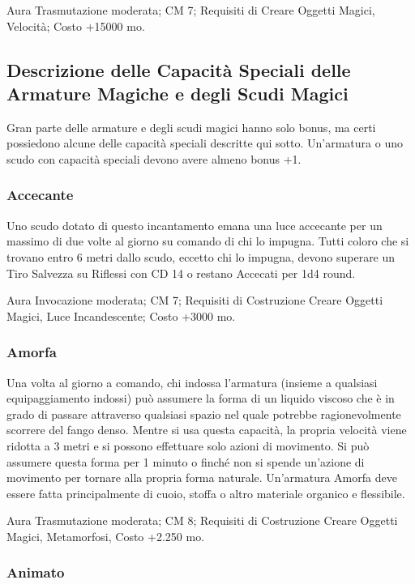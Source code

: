 \begin{multicols}{2}
Aura Trasmutazione moderata; CM 7; Requisiti di Creare Oggetti Magici, Velocità; Costo +15000 mo.

\subsection{Descrizione delle Capacità Speciali delle Armature Magiche e degli Scudi Magici}

Gran parte delle armature e degli scudi magici hanno solo bonus, ma certi possiedono alcune delle capacità speciali descritte qui sotto. Un'armatura o uno scudo con capacità speciali devono avere almeno bonus +1.

\subsubsection{Accecante}

Uno scudo dotato di questo incantamento emana una luce accecante per un massimo di due volte al giorno su comando di chi lo impugna. Tutti coloro che si trovano entro 6 metri dallo scudo, eccetto chi lo impugna, devono superare un Tiro Salvezza su Riflessi con CD 14 o restano Accecati per 1d4 round.

Aura Invocazione moderata; CM 7; Requisiti di Costruzione Creare Oggetti Magici, Luce Incandescente; Costo +3000 mo.

\subsubsection{Amorfa}

Una volta al giorno a comando, chi indossa l'armatura (insieme a qualsiasi equipaggiamento indossi) può assumere la forma di un liquido viscoso che è in grado di passare attraverso qualsiasi spazio nel quale potrebbe ragionevolmente scorrere del fango denso. Mentre si usa questa capacità, la propria velocità viene ridotta a 3 metri e si possono effettuare solo azioni di movimento. Si può assumere questa forma per 1 minuto o finché non si spende un'azione di movimento per tornare alla propria forma naturale. Un'armatura Amorfa deve essere fatta principalmente di cuoio, stoffa o altro materiale organico e flessibile.

Aura Trasmutazione moderata; CM 8; Requisiti di Costruzione Creare Oggetti Magici, Metamorfosi, Costo +2.250 mo.

\subsubsection{Animato}


\end{multicols}
